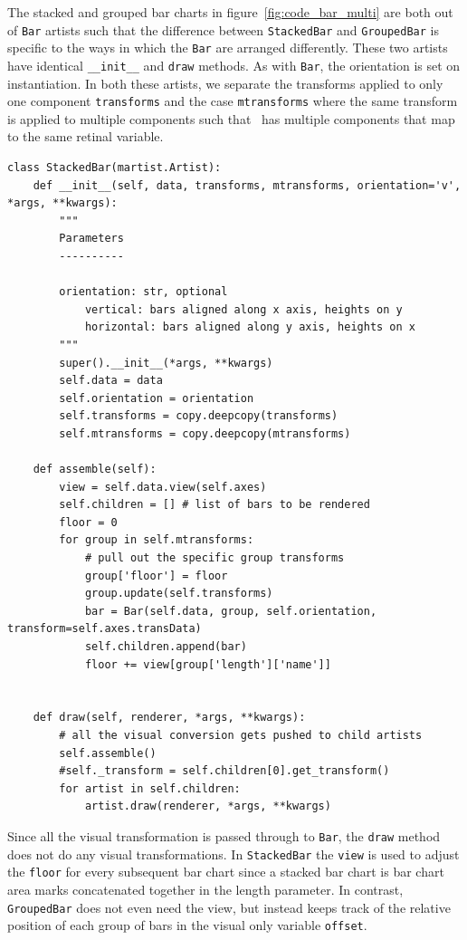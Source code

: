 \documentclass[../main.tex]{subfiles}
\begin{document}
The stacked and grouped bar charts in figure~\ref{fig:code_bar_multi} are both out of \texttt{Bar} artists such that the difference between \texttt{StackedBar} and \texttt{GroupedBar} is specific to the ways in which the \texttt{Bar} are arranged differently. These two artists have identical \texttt{__init__} and \texttt{draw} methods. As with \texttt{Bar}, the orientation is set on instantiation. In both these artists, we separate the transforms applied to only one component \texttt{transforms} and the case \texttt{mtransforms} where the same transform is applied to multiple components such that \votal\ has multiple components that map to the same retinal variable. 
\begin{verbatim}
class StackedBar(martist.Artist):
    def __init__(self, data, transforms, mtransforms, orientation='v', *args, **kwargs):
        """
        Parameters
        ----------
   
        orientation: str, optional
            vertical: bars aligned along x axis, heights on y
            horizontal: bars aligned along y axis, heights on x   
        """
        super().__init__(*args, **kwargs)
        self.data = data
        self.orientation = orientation
        self.transforms = copy.deepcopy(transforms)
        self.mtransforms = copy.deepcopy(mtransforms)

    def assemble(self):
        view = self.data.view(self.axes)
        self.children = [] # list of bars to be rendered
        floor = 0
        for group in self.mtransforms:
            # pull out the specific group transforms
            group['floor'] = floor
            group.update(self.transforms)
            bar = Bar(self.data, group, self.orientation, transform=self.axes.transData)
            self.children.append(bar)
            floor += view[group['length']['name']]
            
            
    def draw(self, renderer, *args, **kwargs):
        # all the visual conversion gets pushed to child artists
        self.assemble()
        #self._transform = self.children[0].get_transform()
        for artist in self.children:
            artist.draw(renderer, *args, **kwargs)

\end{verbatim}
Since all the visual transformation is passed through to \texttt{Bar}, the \texttt{draw} method does not do any visual transformations. In \texttt{StackedBar} the \texttt{view} is used to adjust the \texttt{floor} for every subsequent bar chart since a stacked bar chart is bar chart area marks concatenated together in the length parameter. In contrast, \texttt{GroupedBar} does not even need the view, but instead keeps track of the relative position of each group of bars in the visual only variable \texttt{offset}. 
\end{document}
